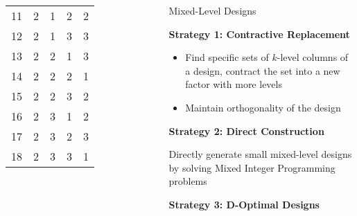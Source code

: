 \documentclass[10pt, compress, aspectratio=169, xcolor={table,usenames,dvipsnames}]{beamer}
\begin{document}
\begin{frame}
\begin{columns}[c]
\begin{table}[]
\begin{tabular}{@{}ccccc@{}}
                    \cellcolor{gray!18}11 & \cellcolor{cyan!25}2 & \cellcolor{green!25}1 & \cellcolor{cyan!25}2 & \cellcolor{cyan!25}2 \\
                    \cellcolor{gray!18}12 & \cellcolor{cyan!25}2 & \cellcolor{green!25}1 & \cellcolor{red!25}3 & \cellcolor{red!25}3 \\
                    \cellcolor{gray!18}13 & \cellcolor{cyan!25}2 & \cellcolor{cyan!25}2 & \cellcolor{green!25}1 & \cellcolor{red!25}3 \\
                    \cellcolor{gray!18}14 & \cellcolor{cyan!25}2 & \cellcolor{cyan!25}2 & \cellcolor{cyan!25}2 & \cellcolor{green!25}1 \\
                    \cellcolor{gray!18}15 & \cellcolor{cyan!25}2 & \cellcolor{cyan!25}2 & \cellcolor{red!25}3 & \cellcolor{cyan!25}2 \\
                    \cellcolor{gray!18}16 & \cellcolor{cyan!25}2 & \cellcolor{red!25}3 & \cellcolor{green!25}1 & \cellcolor{cyan!25}2 \\
                    \cellcolor{gray!18}17 & \cellcolor{cyan!25}2 & \cellcolor{red!25}3 & \cellcolor{cyan!25}2 & \cellcolor{red!25}3 \\
                    \cellcolor{gray!18}18 & \cellcolor{cyan!25}2 & \cellcolor{red!25}3 & \cellcolor{red!25}3 & \cellcolor{green!25}1 \\ \bottomrule
                \end{tabular}
            \end{table}


            \begin{block}{Mixed-Level Designs}

                \vspace{.2cm}

                \textbf{Strategy 1: \alert{Contractive Replacement}}

                \begin{itemize}
                    \item Find \alert{specific sets of $k$-level columns} of a
                        design, \alert{contract} the set into a new
                        \alert{factor with more levels}
                    \item \alert{Maintain orthogonality} of the design
                \end{itemize}

                \textbf{Strategy 2: \alert{Direct Construction}}

                Directly generate \alert{small mixed-level designs} by
                solving \alert{Mixed Integer Programming problems}

                \textbf{Strategy 3: \alert{D-Optimal Designs}}
            \end{block}

    \end{columns}
\end{frame}
\end{document}
